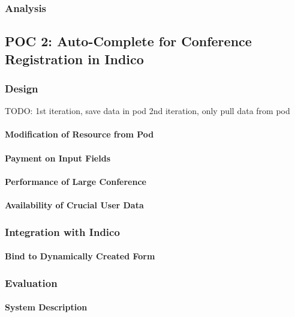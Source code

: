 \subsubsection{Analysis}

\subsection{POC 2: Auto-Complete for Conference Registration in Indico}

\subsubsection{Design}

TODO:
1st iteration, save data in pod
2nd iteration, only pull data from pod

\paragraph{Modification of Resource from Pod}

\paragraph{Payment on Input Fields}

\paragraph{Performance of Large Conference}

\paragraph{Availability of Crucial User Data}

\subsubsection{Integration with Indico}

\paragraph{Bind to Dynamically Created Form}

\subsubsection{Evaluation}

\paragraph{System Description}
